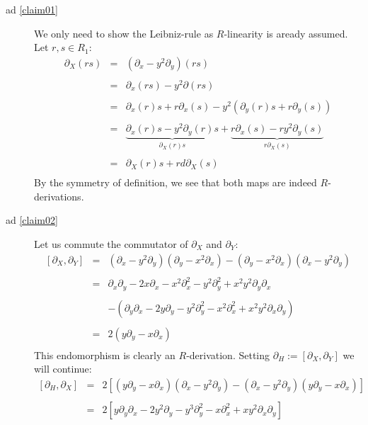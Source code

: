\documentclass[10pt,a4paper]{article}
\begin{document}
\begin{description}
\item[ad \ref{claim01}] We only need to show the Leibniz-rule as $R$-linearity is aready assumed. Let $r, s \in R_1$:
$$\begin{array}{rcl}
\partial_X(r s) &=& (\partial_x - y^2 \partial_y)(r s)\\
&&\\
 &=& \partial_x(r s) - y^2 \partial(r s)\\
 &&\\
 &=& \partial_x(r) s + r \partial_x(s) - y^2(\partial_y(r) s + r \partial_y(s))\\
 &&\\
 &=& \underbrace{\partial_x(r) s - y^2 \partial_y(r) s}_{\partial_X(r) s} +\underbrace{r \partial_x(s) - r y^2 \partial_y(s)}_{r \partial_X(s)}\\
 &&\\
 &=& \partial_X(r) s + r d\partial_X(s)\\
 \end{array}$$
By the symmetry of definition, we see that both maps are indeed $R$-derivations.
\item[ad \ref{claim02}] Let us commute the commutator of $\partial_X$ and $\partial_Y$:
$$\begin{array}{rcl}
[\partial_X, \partial_Y] &=& (\partial_x - y^2 \partial_y)(\partial_y - x^2 \partial_x) - (\partial_y - x^2 \partial_x)(\partial_x - y^2 \partial_y)\\
&&\\
&=& \partial_x \partial_y - 2 x \partial_x - x^2 \partial_x^2 - y^2 \partial_y^2 + x^2 y^2 \partial_y \partial_x \\
&&\\
&& -(\partial_y \partial_x - 2 y \partial_y - y^2 \partial_y^2 - x^2 \partial_x^2 + x^2 y^2 \partial_x \partial_y)\\ 
&&\\
&=& 2 (y \partial_y - x \partial_x)\\
\end{array}$$
This endomorphism is clearly an $R$-derivation. Setting $\partial_H := [\partial_X,\partial_Y]$ we will continue:
$$\begin{array}{rcl}
[\partial_H, \partial_X] &=& 2 [(y \partial_y - x \partial_x)(\partial_x - y^2 \partial_y) - (\partial_x - y^2 \partial_y)(y \partial_y - x \partial_x)]\\
&&\\
&=& 2 \left[y \partial_y \partial_x - 2 y^2 \partial_y - y^3 \partial_y^2 - x \partial_x^2 + x y^2 \partial_x \partial_y\right]\\

\end{array}$$
\end{description}
\end{document}
